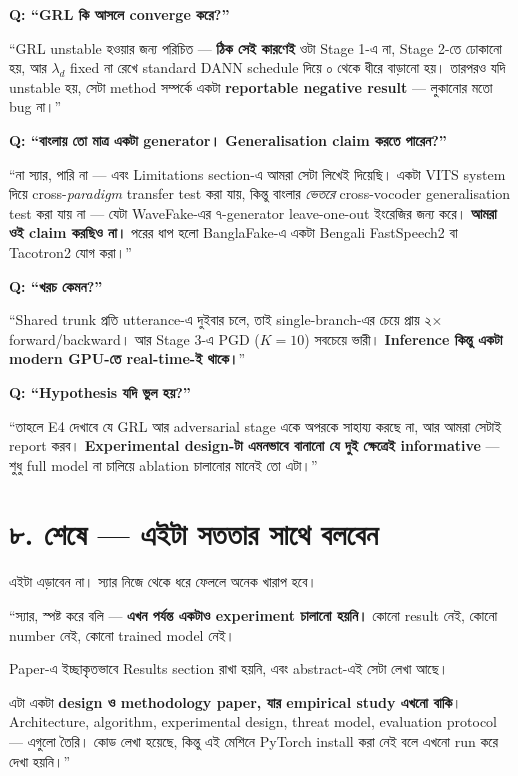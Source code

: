 \documentclass[11pt,a4paper]{article}
\newenvironment{say}{%
  \def\FrameCommand{\textcolor{barcol}{\vrule width 3pt}\hspace{8pt}}%
  \MakeFramed{\advance\hsize-\width \FrameRestore}%
}{\endMakeFramed}
\newenvironment{warn}{%
  \def\FrameCommand{\textcolor{warnbar}{\vrule width 3pt}\hspace{8pt}}%
  \MakeFramed{\advance\hsize-\width \FrameRestore}%
}{\endMakeFramed}
\begin{document}
\textbf{Q: ``GRL কি আসলে converge করে?''}
\begin{say}
``GRL unstable হওয়ার জন্য পরিচিত --- \textbf{ঠিক সেই কারণেই} ওটা Stage 1-এ না,
Stage 2-তে ঢোকানো হয়, আর $\lambda_d$ fixed না রেখে standard DANN schedule দিয়ে
০ থেকে ধীরে বাড়ানো হয়। তারপরও যদি unstable হয়, সেটা method সম্পর্কে একটা
\textbf{reportable negative result} --- লুকানোর মতো bug না।''
\end{say}

\textbf{Q: ``বাংলায় তো মাত্র একটা generator। Generalisation claim করতে পারেন?''}
\begin{say}
``না স্যার, পারি না --- এবং Limitations section-এ আমরা সেটা লিখেই দিয়েছি। একটা
VITS system দিয়ে cross-\emph{paradigm} transfer test করা যায়, কিন্তু বাংলার
\emph{ভেতরে} cross-vocoder generalisation test করা যায় না --- যেটা WaveFake-এর
৭-generator leave-one-out ইংরেজির জন্য করে। \textbf{আমরা ওই claim করছিও না।}
পরের ধাপ হলো BanglaFake-এ একটা Bengali FastSpeech2 বা Tacotron2 যোগ করা।''
\end{say}

\textbf{Q: ``খরচ কেমন?''}
\begin{say}
``Shared trunk প্রতি utterance-এ দুইবার চলে, তাই single-branch-এর চেয়ে প্রায়
২$\times$ forward/backward। আর Stage 3-এ PGD ($K = 10$) সবচেয়ে ভারী।
\textbf{Inference কিন্তু একটা modern GPU-তে real-time-ই থাকে।}''
\end{say}

\textbf{Q: ``Hypothesis যদি ভুল হয়?''}
\begin{say}
``তাহলে E4 দেখাবে যে GRL আর adversarial stage একে অপরকে সাহায্য করছে না, আর
আমরা সেটাই report করব। \textbf{Experimental design-টা এমনভাবে বানানো যে দুই
ক্ষেত্রেই informative} --- শুধু full model না চালিয়ে ablation চালানোর মানেই তো এটা।''
\end{say}

\section*{৮. শেষে --- এইটা সততার সাথে বলবেন}

এইটা এড়াবেন না। স্যার নিজে থেকে ধরে ফেললে অনেক খারাপ হবে।

\begin{warn}
``স্যার, স্পষ্ট করে বলি --- \textbf{এখন পর্যন্ত একটাও experiment চালানো হয়নি।}
কোনো result নেই, কোনো number নেই, কোনো trained model নেই।

\vspace{4pt}
Paper-এ ইচ্ছাকৃতভাবে Results section রাখা হয়নি, এবং abstract-এই সেটা লেখা আছে।

\vspace{4pt}
এটা একটা \textbf{design ও methodology paper, যার empirical study এখনো বাকি}।
Architecture, algorithm, experimental design, threat model, evaluation protocol
--- এগুলো তৈরি। কোড লেখা হয়েছে, কিন্তু এই মেশিনে PyTorch install করা নেই বলে
এখনো run করে দেখা হয়নি।''
\end{warn}
\end{document}
